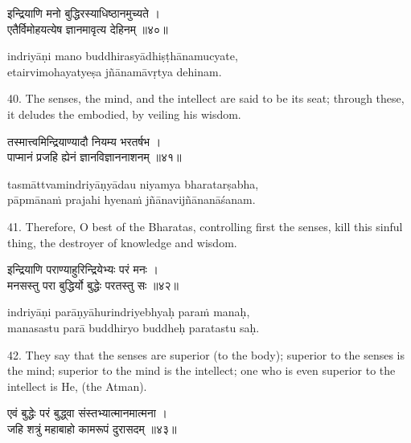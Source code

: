 \begin{gitaverse}
इन्द्रियाणि मनो बुद्धिरस्याधिष्ठानमुच्यते । \\
एतैर्विमोहयत्येष ज्ञानमावृत्य देहिनम् ॥४०॥
\end{gitaverse}

\begin{transliteration}
indriyāṇi mano buddhirasyādhiṣṭhānamucyate, \\
etairvimohayatyeṣa jñānamāvṛtya dehinam.
\end{transliteration}

40. The senses, the mind, and the intellect are said to be its seat; through
these, it deludes the embodied, by veiling his wisdom.

\begin{gitaverse}
तस्मात्त्वमिन्द्रियाण्यादौ नियम्य भरतर्षभ । \\
पाप्मानं प्रजहि ह्येनं ज्ञानविज्ञाननाशनम् ॥४१॥
\end{gitaverse}

\begin{transliteration}
tasmāttvamindriyāṇyādau niyamya bharatarṣabha, \\
pāpmānaṁ prajahi hyenaṁ jñānavijñānanāśanam.
\end{transliteration}

41. Therefore, O best of the Bharatas, controlling first the senses, kill this
sinful thing, the destroyer of knowledge and wisdom.

\begin{gitaverse}
इन्द्रियाणि पराण्याहुरिन्द्रियेभ्यः परं मनः । \\
मनसस्तु परा बुद्धिर्यो बुद्धेः परतस्तु सः ॥४२॥
\end{gitaverse}

\begin{transliteration}
indriyāṇi parāṇyāhurindriyebhyaḥ paraṁ manaḥ, \\
manasastu parā buddhiryo buddheḥ paratastu saḥ.
\end{transliteration}

42. They say that the senses are superior (to the body); superior to the senses
is the mind; superior to the mind is the intellect; one who is even superior to
the intellect is He, (the Atman).

\begin{gitaverse}
एवं बुद्धेः परं बुद्ध्वा संस्तभ्यात्मानमात्मना । \\
जहि शत्रुं महाबाहो कामरूपं दुरासदम् ॥४३॥
\end{gitaverse}

